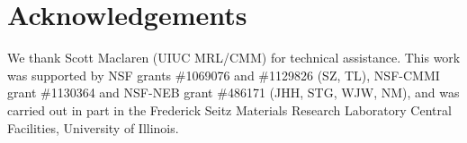 \documentclass[%
 aps,
 pra,
 longbibliography,
 amsmath,amssymb,
 reprint,
 superscriptaddress,
]{revtex4-1}
\begin{document}
\section*{Acknowledgements}
We thank Scott Maclaren (UIUC MRL/CMM) for technical assistance. This work was
supported by NSF grants \#1069076 and \#1129826 (SZ, TL), NSF-CMMI grant
\#1130364 and NSF-NEB grant \#486171 (JHH, STG, WJW, NM), and was carried out
in part in the Frederick Seitz Materials Research Laboratory Central
Facilities, University of Illinois.


\end{document}
